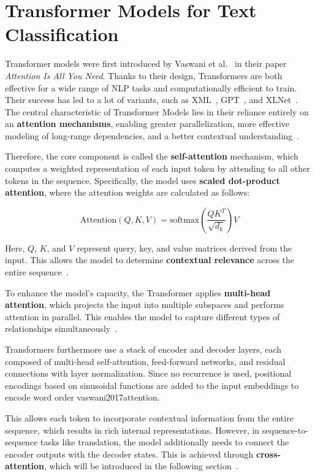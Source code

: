 \section{Transformer Models for Text Classification}

Transformer models were first introduced by Vaswani et al.~\cite{vaswani2017attention} in their paper \textit{Attention Is All You Need}. Thanks to their design, Transformers are both effective for a wide range of NLP tasks and computationally efficient to train. Their success has led to a lot of variants, such as XML~\cite{lample2019cross}, GPT~\cite{radford2018gpt}, and XLNet~\cite{yang2019xlnet}. The central characteristic of Transformer Models lies in their reliance entirely on an \textbf{attention mechanisms}, enabling greater parallelization, more effective modeling of long-range dependencies, and a better contextual understanding~\cite{vaswani2017attention}.

Therefore, the core component is called the \textbf{self-attention} mechanism, which computes a weighted representation of each input token by attending to all other tokens in the sequence. Specifically, the model uses \textbf{scaled dot-product attention}, where the attention weights are calculated as follows:

\[
\text{Attention}(Q, K, V) = \text{softmax}\left(\frac{QK^T}{\sqrt{d_k}}\right)V
\]

Here, $Q$, $K$, and $V$ represent query, key, and value matrices derived from the input. This allows the model to determine \textbf{contextual relevance} across the entire sequence~\cite{vaswani2017attention}.

To enhance the model's capacity, the Transformer applies \textbf{multi-head attention}, which projects the input into multiple subspaces and performs attention in parallel. This enables the model to capture different types of relationships simultaneously~\cite{vaswani2017attention}.

Transformers furthermore use a stack of encoder and decoder layers, each composed of multi-head self-attention, feed-forward networks, and residual connections with layer normalization. Since no recurrence is used, positional encodings based on sinusoidal functions are added to the input embeddings to encode word order {vaswani2017attention}.

This allows each token to incorporate contextual information from the entire sequence, which results in rich internal representations. However, in sequence-to-sequence tasks like translation, the model additionally needs to connect the encoder outputs with the decoder states. This is achieved through \textbf{cross-attention}, which will be introduced in the following section~\cite{vaswani2017attention}.

